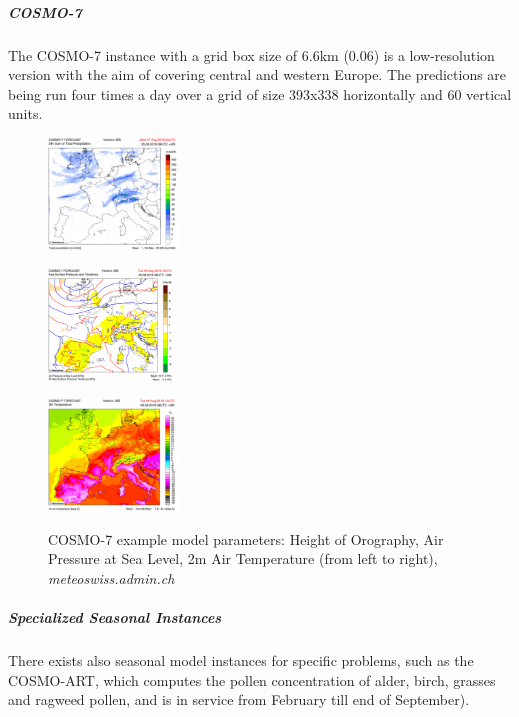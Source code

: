 \subparagraph{COSMO-7}
The COSMO-7 instance with a grid box size of 6.6km (0.06\degree) is a low-resolution version with the aim of covering central and western Europe. The predictions are being run four times a day over a grid of size 393x338 horizontally and 60 vertical units.
\begin{figure}[h]
	\begin{minipage}{.32\columnwidth}
		\centering
		\includegraphics[height=8em]{images/cosmo-7-precipitation.png}
		\label{fig:cosmo-7-precipitation}
	\end{minipage}
	\begin{minipage}{.32\columnwidth}
		\centering
		\includegraphics[height=8em]{images/cosmo-7-forecast.png}
		\label{fig:cosmo-7-forecast}
	\end{minipage}
	\begin{minipage}{.32\columnwidth}
		\centering
		\includegraphics[height=8em]{images/cosmo-7-temperature.png}
		\label{fig:cosmo-7-temperature}
	\end{minipage}
	\caption{COSMO-7 example model parameters: Height of Orography, Air Pressure at Sea Level, 2m Air Temperature (from left to right), \textit{meteoswiss.admin.ch}}
\end{figure}


\subparagraph{Specialized Seasonal Instances}
There exists also seasonal model instances for specific problems, such as the COSMO-ART, which computes the pollen concentration of alder, birch, grasses and ragweed pollen, and is in service from February till end of September).






